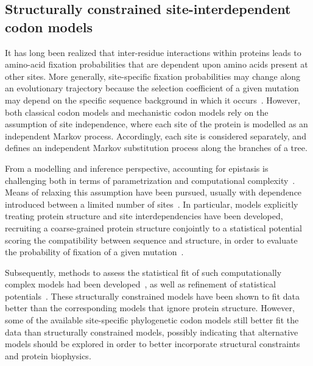\subsection{Structurally constrained site-interdependent codon models}
\label{subsec:structurally-constrained-site-interdependent-codon-models}

It has long been realized that inter-residue interactions within proteins leads to amino-acid fixation probabilities that are dependent upon amino acids present at other sites.
More generally, site-specific fixation probabilities may change along an evolutionary trajectory because the selection coefficient of a given mutation may depend on the specific sequence background in which it occurs~\citep{Goldstein2016}.
However, both classical codon models and mechanistic codon models rely on the assumption of site independence, where each site of the protein is modelled as an independent Markov process.
Accordingly, each site is considered separately, and defines an independent Markov substitution process along the branches of a tree.

From a modelling and inference perspective, accounting for epistasis is challenging both in terms of parametrization and computational complexity~\citep{Manhart2014}.
Means of relaxing this assumption have been pursued, usually with dependence introduced between a limited number of sites~\citep{Felsenstein1996}.
In particular, models explicitly treating protein structure and site interdependencies have been developed, recruiting a coarse-grained protein structure conjointly to a statistical potential scoring the compatibility between sequence and structure, in order to evaluate the probability of fixation of a given mutation~\citep{Robinson2003, Rodrigue2005}.

Subsequently, methods to assess the statistical fit of such computationally complex models had been developed~\citep{Rodrigue2009}, as well as refinement of statistical potentials~\citep{Kleinman2010}.
These structurally constrained models have been shown to fit data better than the corresponding models that ignore protein structure.
However, some of the available site-specific phylogenetic codon models still better fit the data than structurally constrained models, possibly indicating that alternative models should be explored in order to better incorporate structural constraints and protein biophysics.

